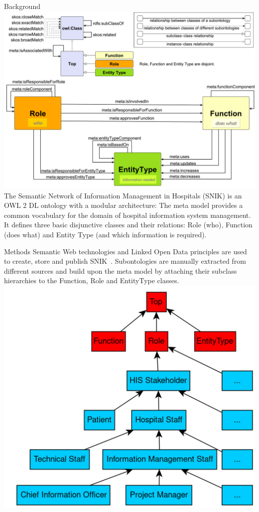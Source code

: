 \documentclass[portrait,final,a0paper,fontscale=0.310]{baposter}
\begin{document}
\begin{poster}
\begin{posterbox}[name=background,column=0,row=0]{Background}
\includegraphics[width=1.01\columnwidth]{img/metamodel9s.pdf}
The Semantic Network of Information Management in Hospitals (SNIK) is an OWL 2 DL ontology with a modular architecture:
The meta model provides a common vocabulary for the domain of hospital information system management.
It defines three basic disjunctive classes and their relations: Role (who), Function (does what) and Entity Type (and which information is required). %
\vspace{0.3em}
\end{posterbox}
\begin{posterbox}[name=methods,below=background]{Methods}
Semantic Web technologies and Linked Open Data principles are used to create, store and publish SNIK~\cite{sniktec}.
Subontologies are manually extracted from different sources and build upon the meta model by attaching their subclass hierarchies to the Function, Role and EntityType classes.
{\centering\includegraphics[width=0.8\columnwidth]{img/hierarchy.png}}

\end{posterbox}
\end{poster}
\end{document}

